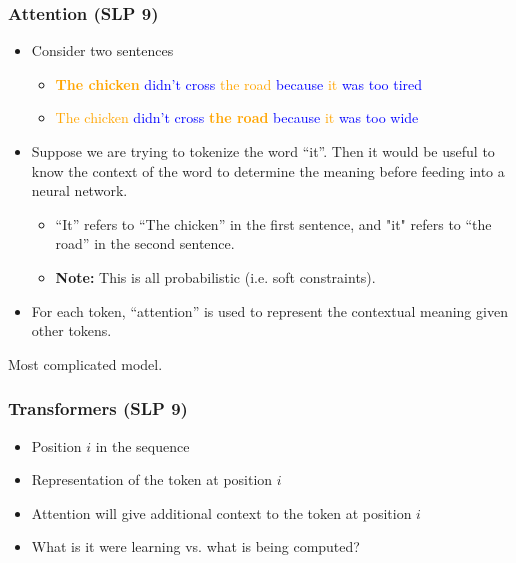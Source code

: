 
\subsubsection{Attention (SLP 9)}
\begin{definition}
    \begin{itemize}
        \item Consider two sentences
        \begin{itemize}
            \item \textbf{\textcolor{orange}{The chicken}} \textcolor{blue}{didn’t cross} \textcolor{orange}{the road} \textcolor{blue}{because} \textcolor{orange}{it} \textcolor{blue}{was too tired}
            \item \textcolor{orange}{The chicken} \textcolor{blue}{didn’t cross} \textbf{\textcolor{orange}{the road}} \textcolor{blue}{because} \textcolor{orange}{it} \textcolor{blue}{was too wide}
        \end{itemize}
        \item Suppose we are trying to tokenize the word ``it''. Then it would be useful to know the context of the word to determine the meaning before feeding into a neural network.
        \begin{itemize}
            \item ``It'' refers to ``The chicken'' in the first sentence, and "it" refers to ``the road'' in the second sentence.
            \item \textbf{Note:} This is all probabilistic (i.e. soft constraints).
        \end{itemize}
        \item For each token, ``attention'' is used to represent the contextual meaning given other tokens.
    \end{itemize}
\end{definition}

\begin{warning}
    Most complicated model.
\end{warning}


\subsubsection{Transformers (SLP 9)}
\begin{summary}
    \begin{itemize}
        \item Position $i$ in the sequence 
        \item Representation of the token at position $i$
        \item Attention will give additional context to the token at position $i$
        \item What is it were learning vs. what is being computed?
    \end{itemize}
\end{summary}

